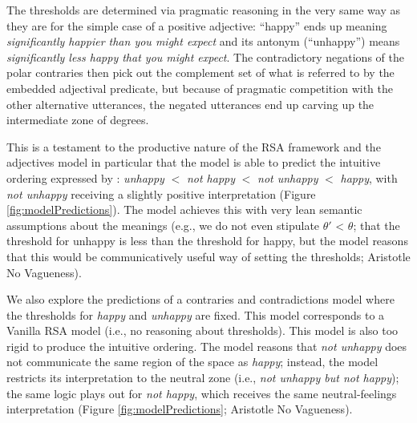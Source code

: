 \documentclass[floatsintext,doc]{apa6}
\begin{document}
The thresholds are determined via pragmatic reasoning in the very same way as they are for the simple case of a positive adjective: ``happy'' ends up meaning \emph{significantly happier than you might expect} and its antonym (``unhappy'') means \emph{significantly less happy that you might expect}. 
The contradictory negations of the polar contraries then pick out the complement set of what is referred to by the embedded adjectival predicate, but because of pragmatic competition with the other alternative utterances, the negated utterances end up carving up the intermediate zone of degrees. 

This is a testament to the productive nature of the RSA framework and the  adjectives model in particular that the model is able to predict the intuitive ordering expressed by : \emph{unhappy} $<$ \emph{not happy} $<$ \emph{not unhappy} $<$ \emph{happy}, with \emph{not unhappy} receiving a slightly positive interpretation (Figure \ref{fig:modelPredictions}).
The model achieves this with very lean semantic assumptions about the meanings (e.g., we do not even stipulate $\theta'$ < $\theta$; that the threshold for unhappy is less than the threshold for happy, but the model reasons that this would be communicatively useful way of setting the thresholds; Aristotle No Vagueness).

We also explore the predictions of a contraries and contradictions model where the thresholds for \emph{happy} and \emph{unhappy} are fixed. This model corresponds to a Vanilla RSA model (i.e., no reasoning about thresholds). 
This model is also too rigid to produce the intuitive ordering. 
The model reasons that \emph{not unhappy} does not communicate the same region of the space as \emph{happy}; instead, the model restricts its interpretation to the neutral zone (i.e., \emph{not unhappy but not happy}); the same logic plays out for \emph{not happy}, which receives the same neutral-feelings interpretation  (Figure \ref{fig:modelPredictions}; Aristotle No Vagueness).



\end{document}
